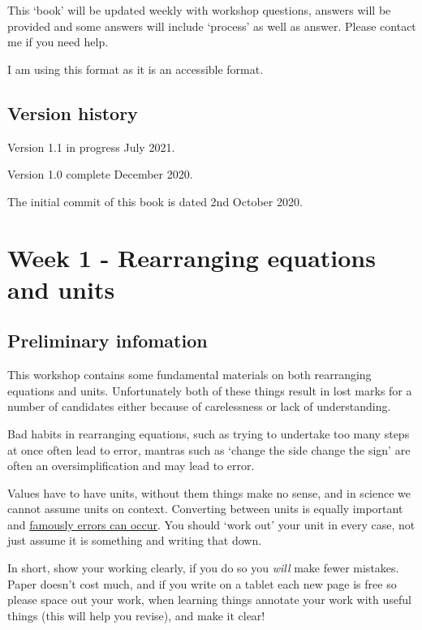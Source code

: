 \documentclass[
]{book}
\begin{document}
This `book' will be updated weekly with workshop questions, answers will be provided and some answers will include `process' as well as answer. Please contact me if you need help.

I am using this format as it is an accessible format.

\hypertarget{version-history}{%
\section*{Version history}\label{version-history}}

Version 1.1 in progress July 2021.

Version 1.0 complete December 2020.

The initial commit of this book is dated 2nd October 2020.

\hypertarget{ch:Workshop1}{%
\chapter{Week 1 - Rearranging equations and units}\label{ch:Workshop1}}

\hypertarget{sec:Prelim}{%
\section{Preliminary infomation}\label{sec:Prelim}}

This workshop contains some fundamental materials on both rearranging equations and units. Unfortunately both of these things result in lost marks for a number of candidates either because of carelessness or lack of understanding.

Bad habits in rearranging equations, such as trying to undertake too many steps at once often lead to error, mantras such as `change the side change the sign' are often an oversimplification and may lead to error.

Values have to have units, without them things make no sense, and in science we cannot assume units on context. Converting between units is equally important and \href{https://www.bbc.co.uk/news/uk-england-tyne-38744307}{famously errors can occur}. You should `work out' your unit in every case, not just assume it is something and writing that down.

In short, show your working clearly, if you do so you \emph{will} make fewer mistakes. Paper doesn't cost much, and if you write on a tablet each new page is free so please space out your work, when learning things annotate your work with useful things (this will help you revise), and make it clear!
\end{document}
